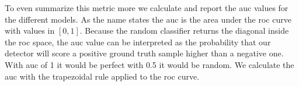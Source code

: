 To even summarize this metric more we calculate and report the \gls{auc} values for the different models. As the name states the \gls{auc} is the area under the \gls{roc} curve with values in $[0, 1]$. Because the random classifier returns the diagonal inside the \gls{roc} space, the \gls{auc} value can be interpreted as the probability that our detector will score a positive ground truth sample higher than a negative one. With \gls{auc} of 1 it would be perfect with 0.5 it would be random. We calculate the \gls{auc} with the trapezoidal rule applied to the \gls{roc} curve.
